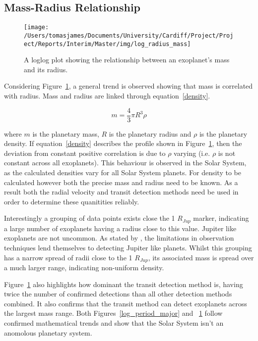 \documentclass{report}
\begin{document}
\subsection*{Mass-Radius Relationship}

\begin{figure}[H]
\centering
    \texttt{[image: /Users/tomasjames/Documents/University/Cardiff/Project/Project/Reports/Interim/Master/img/log\_radius\_mass]}
\caption{A loglog plot showing the relationship between an exoplanet's mass and its radius.}\label{log_radius_mass}
\end{figure}

Considering Figure~\ref{log_radius_mass}, a general trend is observed showing that mass is correlated with radius. Mass and radius are linked through equation~\ref{density}.

\begin{equation} \label{density}
    m = \frac{4}{3}\pi R^3 \rho
\end{equation}

 where $m$ is the planetary mass, $R$ is the planetary radius and $\rho$ is the planetary density. If equation~\ref{density} describes the profile shown in Figure~\ref{log_radius_mass}, then the deviation from constant positive correlation is due to $\rho$ varying (i.e. $\rho$ is not constant across all exoplanets). This behaviour is observed in the Solar System, as the calculated densities vary for all Solar System planets. For density to be calculated however both the precise mass and radius need to be known. As a result both the radial velocity and transit detection methods need be used in order to determine these quanitities reliably.

 Interestingly a grouping of data points exists close the 1 $R_{Jup}$ marker, indicating a large number of exoplanets having a radius close to this value. Jupiter like exoplanets are not uncommon. As stated by \textcite{stats}, the limitations in observation techniques lend themselves to detecting Jupiter like planets. Whilst this grouping has a narrow spread of radii close to the 1 $R_{Jup}$, its associated mass is spread over a much larger range, indicating non-uniform density.

 Figure~\ref{log_radius_mass} also highlights how dominant the transit detection method is, having twice the number of confirmed detections than all other detection methods combined. It also confirms that the transit method can detect exoplanets across the largest mass range. Both Figures~\ref{log_period_major} and ~\ref{log_radius_mass} follow confirmed mathematical trends and show that the Solar System isn't an anomolous planetary system.
\end{document}
